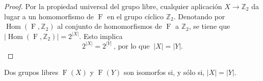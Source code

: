 \begin{proof}
Por la propiedad universal del grupo libre, cualquier aplicación $X \rightarrow \mathbb{Z}_2$ da lugar a un homomorfismo de $\operatorname{F}$ en el grupo cíclico $\mathbb{Z}_2$. Denotando por $\operatorname{Hom}(\operatorname{F},\mathbb{Z}_2)$ al conjunto de homomorfismos de $\operatorname{F}$ a $\mathbb{Z}_2$, se tiene que $|\operatorname{Hom}(\operatorname{F},\mathbb{Z}_2)|=2^{|X|}$. Esto implica
\[
    2^{|X|} = 2^{|Y|} \: \text{, por lo que } \:  |X|=|Y|.
\]\end{proof}








\begin{theorem} \label{dema}
Dos grupos libres $\operatorname{F}(X)$ y $\operatorname{F}(Y)$ son isomorfos si, y sólo si, $|X|=|Y|$.
\end{theorem}


